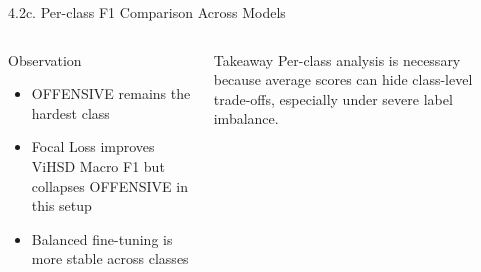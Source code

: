 \documentclass[11pt, aspectratio=169]{beamer}
\begin{document}
\begin{frame}[shrink=12]{4.2c. Per-class F1 Comparison Across Models}

\begin{table}[h]
  \centering
  \caption{Per-class F1 comparison on ViHSD}
  \vspace{0.2cm}
\end{table}

\vspace{0.2cm}
\begin{columns}[T]
  \begin{block}{Observation}
    \begin{itemize}
      \item OFFENSIVE remains the hardest class
      \item Focal Loss improves ViHSD Macro F1 but collapses OFFENSIVE in this setup
      \item Balanced fine-tuning is more stable across classes
    \end{itemize}
  \end{block}

  \begin{block}{Takeaway}
    Per-class analysis is necessary because average scores can hide class-level trade-offs, especially under severe label imbalance.
  \end{block}
\end{columns}
\end{frame}
\end{document}
